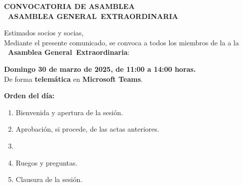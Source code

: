 \documentclass[a4paper,12pt]{article}
\newcommand{\assemblyType}{Extraordinaria}
\newcommand{\assemblyDate}{Domingo 30 de marzo de 2025, de 11:00 a 14:00 horas.}
\newcommand{\assemblyPresence}{telemática}
\newcommand{\assemblyUbication}{Microsoft Teams}
\newcommand{\headerSubject}{CONVOCATORIA DE ASAMBLEA}
\newcommand{\assemblyNumber}{1} %
\newcommand{\assemblyName}{\Romannum{\assemblyNumber}~Asamblea General~\assemblyType}
\newcommand{\subject}{\headerSubject \\ \MakeUppercase{\assemblyName}}
\begin{document}
\begin{center}
    \large \textbf{\subject}
\end{center}

Estimados socios y socias, \\

Mediante el presente comunicado, se convoca a todos los miembros de la \textbf{\nombreAsociacion} a la \textbf{\assemblyName}:

\begin{center}
    \textbf{\assemblyDate}\\
    De forma \textbf{\assemblyPresence} en \textbf{\assemblyUbication}.
\end{center}

\textbf{Orden del día:}
\begin{enumerate}
    \item Bienvenida y apertura de la sesión.
    \item Aprobación, si procede, de las actas anteriores.
    \item
    \item Ruegos y preguntas.
    \item Clausura de la sesión.
\end{enumerate}

\firma
\end{document}
